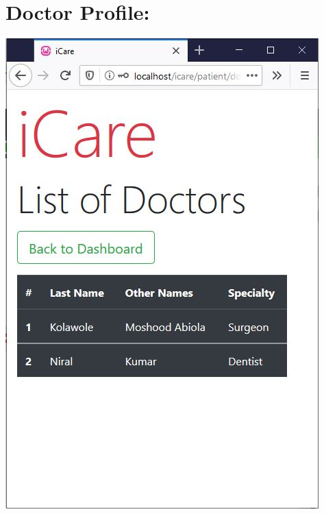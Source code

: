 \documentclass[a4paper,12pt]{report}
\begin{document}
\section*{Doctor Profile:}
\includegraphics[scale=0.8]{Implementation/doctorProfile.JPG}
\end{document}
